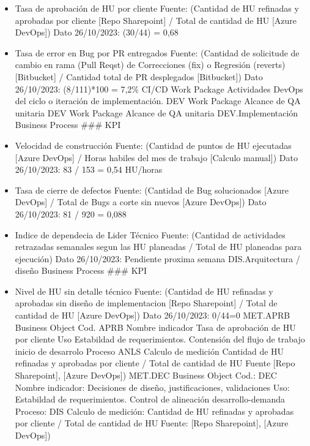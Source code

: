 \documentclass[
  paper=a4,
  ,captions=tableheading
]{scrartcl}
\begin{document}
\begin{itemize}
\item
  Tasa de aprobación de HU por cliente Fuente: (Cantidad de HU refinadas
  y aprobadas por cliente {[}Repo Sharepoint{]} / Total de cantidad de
  HU {[}Azure DevOps{]}) Dato 26/10/2023: (30/44) = 0,68
\item
  Tasa de error en Bug por PR entregados Fuente: (Cantidad de solicitude
  de cambio en rama (Pull Reqst) de Correcciones (fix) o Regresión
  (reverts) {[}Bitbucket{]} / Cantidad total de PR desplegados
  {[}Bitbucket{]}) Dato 26/10/2023: (8/111)*100 = 7,2\% \textbar{}
  \textbar{} CI/CD \textbar{} Work Package \textbar{} Actividades DevOps
  del ciclo o iteración de implementación. \textbar{} \textbar{} DEV
  \textbar{} Work Package \textbar{} Alcance de QA unitaria \textbar{}
  \textbar{} DEV \textbar{} Work Package \textbar{} Alcance de QA
  unitaria \textbar{} \textbar{} DEV.Implementación \textbar{} Business
  Process \textbar{} \#\#\# KPI
\item
  Velocidad de construcción Fuente: (Cantidad de puntos de HU ejecutadas
  {[}Azure DevOps{]} / Horas habiles del mes de trabajo {[}Calculo
  manual{]}) Dato 26/10/2023: 83 / 153 = 0,54 HU/horas
\item
  Tasa de cierre de defectos Fuente: (Cantidad de Bug solucionados
  {[}Azure DevOps{]} / Total de Bugs a corte sin nuevos {[}Azure
  DevOps{]}) Dato 26/10/2023: 81 / 920 = 0,088
\item
  Indice de dependecia de Lider Técnico Fuente: (Cantidad de actividades
  retrazadas semanales segun las HU planeadas / Total de HU planeadas
  para ejecución) Dato 26/10/2023: Pendiente proxima semana \textbar{}
  \textbar{} DIS.Arquitectura / diseño \textbar{} Business Process
  \textbar{} \#\#\# KPI
\item
  Nivel de HU sin detalle técnico Fuente: (Cantidad de HU refinadas y
  aprobadas sin diseño de implementacion {[}Repo Sharepoint{]} / Total
  de cantidad de HU {[}Azure DevOps{]}) Dato 26/10/2023: 0/44=0
  \textbar{} \textbar{} MET.APRB \textbar{} Business Object \textbar{}
  Cod. APRB Nombre indicador Tasa de aprobación de HU por cliente Uso
  Estabildad de requerimientos. Contensión del flujo de trabajo inicio
  de desarrolo Proceso ANLS Calculo de medición Cantidad de HU refinadas
  y aprobadas por cliente / Total de cantidad de HU Fuente {[}Repo
  Sharepoint{]}, {[}Azure DevOps{]}) \textbar{} \textbar{} MET.DEC
  \textbar{} Business Object \textbar{} Cod.: DEC Nombre indicador:
  Decisiones de diseño, justificaciones, validaciones Uso: Estabildad de
  requerimientos. Control de alineación desarrollo-demanda Proceso: DIS
  Calculo de medición: Cantidad de HU refinadas y aprobadas por cliente
  / Total de cantidad de HU Fuente: {[}Repo Sharepoint{]}, {[}Azure
  DevOps{]})
\end{itemize}
\end{document}
